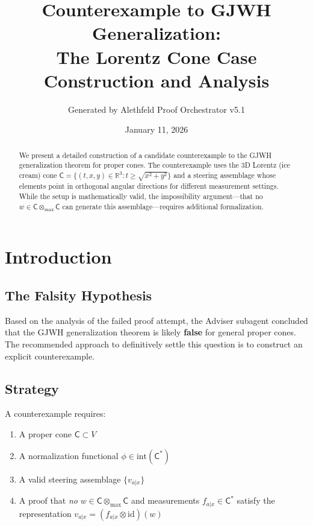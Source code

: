 \documentclass[11pt,a4paper]{article}
\title{Counterexample to GJWH Generalization:\\
The Lorentz Cone Case\\[0.5em]
\large Construction and Analysis}
\author{Generated by Alethfeld Proof Orchestrator v5.1}
\date{January 11, 2026}
\theoremstyle{definition}
\newcommand{\C}{\mathsf{C}}
\newcommand{\Cstar}{\mathsf{C}^*}
\newcommand{\tmax}{\otimes_{\max}}
\newcommand{\R}{\mathbb{R}}
\newcommand{\interior}{\mathrm{int}}
\newcommand{\id}{\mathrm{id}}
\begin{document}
\maketitle

\begin{abstract}
We present a detailed construction of a candidate counterexample to the GJWH generalization theorem for proper cones. The counterexample uses the 3D Lorentz (ice cream) cone $\C = \{(t,x,y) \in \R^3 : t \geq \sqrt{x^2 + y^2}\}$ and a steering assemblage whose elements point in orthogonal angular directions for different measurement settings. While the setup is mathematically valid, the impossibility argument---that no $w \in \C \tmax \C$ can generate this assemblage---requires additional formalization.
\end{abstract}

\tableofcontents
\newpage

\section{Introduction}

\subsection{The Falsity Hypothesis}

Based on the analysis of the failed proof attempt, the Adviser subagent concluded that the GJWH generalization theorem is likely \textbf{false} for general proper cones. The recommended approach to definitively settle this question is to construct an explicit counterexample.

\subsection{Strategy}

A counterexample requires:
\begin{enumerate}
    \item A proper cone $\C \subset V$
    \item A normalization functional $\phi \in \interior(\Cstar)$
    \item A valid steering assemblage $\{v_{a|x}\}$
    \item A proof that \emph{no} $w \in \C \tmax \C$ and measurements $f_{a|x} \in \Cstar$ satisfy the representation $v_{a|x} = (f_{a|x} \otimes \id)(w)$
\end{enumerate}
\end{document}
